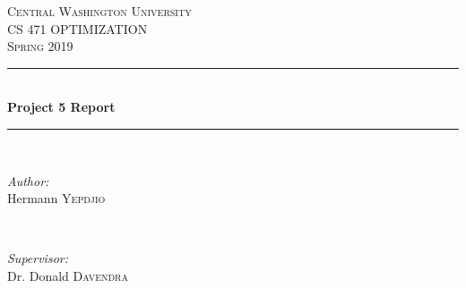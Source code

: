 \documentclass[12pt]{article}
\begin{document}
	
	\begin{titlepage}
		
		\newcommand{\HRule}{\rule{\linewidth}{0.5mm}} %
		
		\center %
		
		
		\textsc{\LARGE Central Washington University}\\[1.5cm] %
		\textsc{\Large CS 471 OPTIMIZATION}\\[0.5cm] %
		\textsc{\large Spring 2019}\\[0.5cm] %
		
		
		\HRule \\[0.4cm]
		{ \huge \bfseries Project 5 Report}\\[0.4cm] %
		\HRule \\[1.5cm]
		
		
		\begin{minipage}{0.4\textwidth}
			\begin{flushleft} \large
				\emph{Author:}\\
				Hermann \textsc{Yepdjio} %
			\end{flushleft}
		\end{minipage}
		~
		\begin{minipage}{0.4\textwidth}
			\begin{flushright} \large
				\emph{Supervisor:} \\
				Dr. Donald \textsc{Davendra} %
			\end{flushright}
		\end{minipage}\\[1cm]
		

\end{titlepage}
\end{document}
